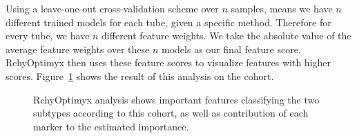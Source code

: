 Using a leave-one-out cross-validation scheme over $n$ samples, means we have $n$ different trained models for each tube, given a specific method. Therefore for every tube, we have $n$ different feature weights. We take the absolute value of the average feature weights over these $n$ models as our final feature score. RchyOptimyx then uses these feature scores to visualize features with higher scores. Figure~\ref{fig:fcs-qa-rchy1} shows the result of this analysis on the cohort.

\begin{figure}[!ht]
  \caption{RchyOptimyx analysis shows important features classifying the two subtypes according to this cohort, as well as contribution of each marker to the estimated importance.}
  \label{fig:fcs-qa-rchy1}
\end{figure}

